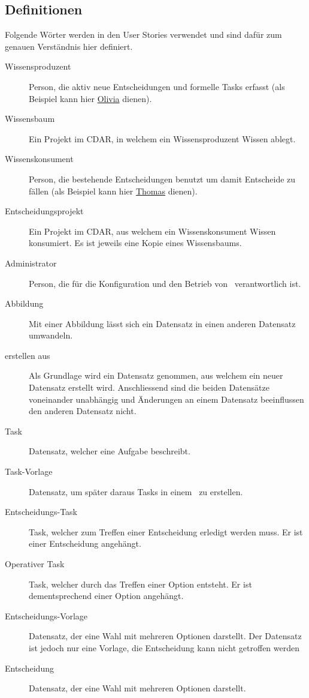 	\subsection{Definitionen}\label{userstoryDefinitions}
		Folgende Wörter werden in den User Stories verwendet und sind dafür zum genauen Verständnis hier definiert.
		\begin{description}
			\item[Wissensproduzent] Person, die aktiv neue Entscheidungen und formelle Tasks erfasst (als Beispiel kann hier \hyperref[olivia]{Olivia} dienen).
			\item[Wissensbaum] Ein Projekt im CDAR, in welchem ein Wissensproduzent Wissen ablegt.
			\item[Wissenskonsument] Person, die bestehende Entscheidungen benutzt um damit Entscheide zu fällen (als Beispiel kann hier \hyperref[thomas]{Thomas} dienen).
			\item[Entscheidungsprojekt] Ein Projekt im CDAR, aus welchem ein Wissenskonsument Wissen konsumiert.
				Es ist jeweils eine Kopie eines Wissensbaums.
			\item[Administrator] Person, die für die Konfiguration und den Betrieb von \eeppi\ verantwortlich ist.
			\item[Abbildung] Mit einer Abbildung lässt sich ein Datensatz in einen anderen Datensatz umwandeln.
			\item[erstellen aus] Als Grundlage wird ein Datensatz genommen, aus welchem ein neuer Datensatz erstellt wird.
				Anschliessend sind die beiden Datensätze voneinander unabhängig und Änderungen an einem Datensatz beeinflussen den anderen Datensatz nicht.
			\item[Task] Datensatz, welcher eine Aufgabe beschreibt.
			\item[Task-Vorlage] Datensatz, um später daraus Tasks in einem \ppt\ zu erstellen.
			\item[Entscheidungs-Task] Task, welcher zum Treffen einer Entscheidung erledigt werden muss.
				Er ist einer Entscheidung angehängt.
			\item[Operativer Task] Task, welcher durch das Treffen einer Option entsteht.
				Er ist dementsprechend einer Option angehängt.
			\item[Entscheidungs-Vorlage] Datensatz, der eine Wahl mit mehreren Optionen darstellt.
				Der Datensatz ist jedoch nur eine Vorlage, die Entscheidung kann nicht getroffen werden
			\item[Entscheidung] Datensatz, der eine Wahl mit mehreren Optionen darstellt.

\end{description}
